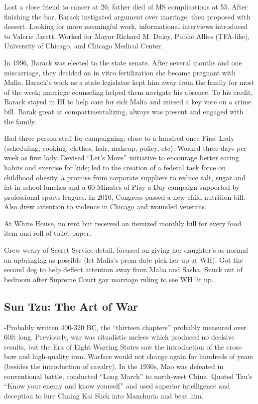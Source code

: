 \documentclass[
]{article}
\begin{document}
Lost a close friend to cancer at 26; father died of MS complications at
55. After finishing the bar, Barack instigated argument over marriage,
then proposed with dessert. Looking for more meaningful work,
informational interviews introduced to Valerie Jarett. Worked for Mayor
Richard M. Daley, Public Allies (TFA-like), University of Chicago, and
Chicago Medical Center.

In 1996, Barack was elected to the state senate. After several months
and one miscarriage, they decided on in vitro fertilization she became
pregnant with Malia. Barack's work as a state legislator kept him away
from the family for most of the week; marriage counseling helped them
navigate his absence. To his credit, Barack stayed in HI to help care
for sick Malia and missed a key vote on a crime bill. Barak great at
compartmentalizing, always was present and engaged with the family.

Had three person staff for campaigning, close to a hundred once First
Lady (scheduling, cooking, clothes, hair, makeup, policy, etc). Worked
three days per week as first lady. Devised ``Let's Move'' initiative to
encourage better eating habits and exercise for kids; led to the
creation of a federal task force on childhood obesity, a promise from
corporate suppliers to reduce salt, sugar and fat in school lunches and
a 60 Minutes of Play a Day campaign supported by professional sports
leagues. In 2010, Congress passed a new child nutrition bill. Also drew
attention to violence in Chicago and wounded veterans.

At White House, no rent but received an itemized monthly bill for every
food item and roll of toilet paper.

Grew weary of Secret Service detail, focused on giving her daughter's as
normal an upbringing as possible (let Malia's prom date pick her up at
WH). Got the second dog to help deflect attention away from Malia and
Sasha. Snuck out of bedroom after Supreme Court gay marriage ruling to
see WH lit up.

\hypertarget{sun-tzu-the-art-of-war}{%
\subsection{Sun Tzu: The Art of War}\label{sun-tzu-the-art-of-war}}

-Probably written 400-320 BC, the ``thirteen chapters'' probably
measured over 60ft long. Previously, war was ritualistic melees which
produced no decisive results, but the Era of Eight Warring States saw
the introduction of the cross-bow and high-quality iron. Warfare would
not change again for hundreds of years (besides the introduction of
cavalry). In the 1930s, Mao was defeated in conventional battle,
conducted ``Long March'' to north-west China. Quoted Tzu's ``Know your
enemy and know yourself'' and used superior intelligence and deception
to lure Chaing Kai Shek into Manchuria and beat him.
\end{document}
